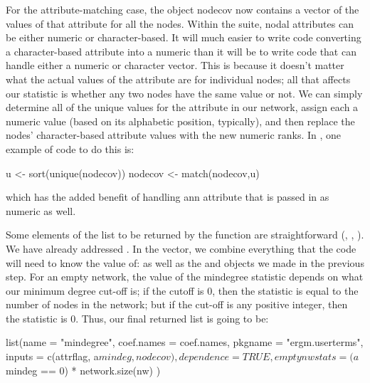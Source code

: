 \documentclass[nojss]{jss}
\begin{document}
For the attribute-matching case, the object nodecov now contains a vector of the values of that attribute for all the nodes. Within the  suite, nodal attributes can be either numeric or character-based. It will much easier to write  code converting a character-based attribute into a numeric than it will be to write  code that can handle either a numeric or character vector.  This is because it doesn't matter what the actual values of the attribute are for individual nodes; all that affects our statistic is whether any two nodes have the same value or not.  We can simply determine all of the unique values for the attribute in our network, assign each a numeric value (based on its alphabetic position, typically), and then replace the nodes' character-based attribute values with the new numeric ranks.  In , one example of code to do this is:

\begin{CodeChunk}
\begin{CodeInput}
  u <- sort(unique(nodecov))
  nodecov <- match(nodecov,u)
\end{CodeInput}
\end{CodeChunk}

which has the added benefit of handling ann attribute that is passed in as numeric as well.

Some elements of the list to be returned by the function are straightforward (, , ).  We have already addressed . In the  vector, we combine everything that the  code will need to know the value of:  as well as the  and  objects we made in the previous step. For an empty network, the value of the mindegree statistic depends on what our minimum degree cut-off is; if the cutoff is 0, then the statistic is equal to the number of nodes in the network; but if the cut-off is any positive integer, then the statistic is 0. Thus, our final returned list is going to be:

\begin{CodeChunk}
\begin{CodeInput}
  list(name = "mindegree",
    coef.names = coef.names,
    pkgname = "ergm.userterms",
    inputs = c(attrflag, a$mindeg, nodecov),
    dependence = TRUE,
    emptynwstats = (a$mindeg == 0) * network.size(nw)
  )
\end{CodeInput}
\end{CodeChunk}
\end{document}

